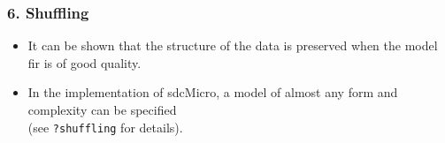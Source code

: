 \documentclass{beamer}
\begin{document}
\begin{frame}
	\frametitle{6. Shuffling}
	\begin{itemize}
\item It can be shown that the structure of the data is preserved when the model fir
is of good quality. \item In the implementation of sdcMicro, a model of almost any form
and complexity can be specified 
\\ (see \texttt{?shuffling} for details).
\end{itemize}
\end{frame}
\end{document}
